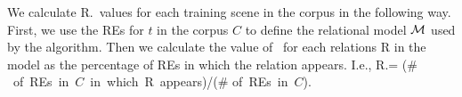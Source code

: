 We calculate R.\puse\ values for each training scene in the corpus in the following way.
First, we use the REs for $t$ in the corpus $C$ to define the relational model $\mathcal{M}$
used by the algorithm.  
Then we calculate the value of \puse\ for each relations R in the model as the percentage of REs in which the relation appears.  I.e., 
R.\puse = (\# \mbox{ of REs in $C$ in which R appears})/(\# \mbox{of REs in $C$}).
%
%
%
%
%
%
